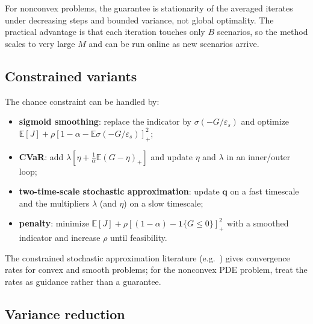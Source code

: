 \documentclass[11pt]{article}
\numberwithin{equation}{section}
\newcommand{\E}{\mathbb{E}}
\newcommand{\qq}{\mathbf{q}}
\newcommand{\ind}{\mathbf{1}}
\theoremstyle{plain}
\begin{document}
For nonconvex problems, the guarantee is stationarity of the averaged iterates
under decreasing steps and bounded variance, not global optimality.  The
practical advantage is that each iteration touches only $B$ scenarios, so the
method scales to very large $M$ and can be run online as new scenarios arrive.

\subsection{Constrained variants}

The chance constraint can be handled by:
\begin{itemize}[leftmargin=1.6em,itemsep=2pt]
  \item \textbf{sigmoid smoothing}: replace the indicator by
        $\sigma(-G/\varepsilon_s)$ and optimize
        $\E[J]+\rho[1-\alpha-\E\sigma(-G/\varepsilon_s)]_+^2$;
  \item \textbf{CVaR}: add $\lambda[\eta+\frac{1}{\alpha}\E(G-\eta)_+]$ and
        update $\eta$ and $\lambda$ in an inner/outer loop;
  \item \textbf{two-time-scale stochastic approximation}: update $\qq$ on a
        fast timescale and the multipliers $\lambda$ (and $\eta$) on a slow
        timescale;
  \item \textbf{penalty}: minimize $\E[J]+\rho[(1-\alpha)-\ind\{G\le0\}]_+^2$
        with a smoothed indicator and increase $\rho$ until feasibility.
\end{itemize}
The constrained stochastic approximation literature (e.g.\
\citealp{nemirovski2009}) gives convergence rates for convex and smooth
problems; for the nonconvex PDE problem, treat the rates as guidance rather
than a guarantee.

\subsection{Variance reduction}
\end{document}
